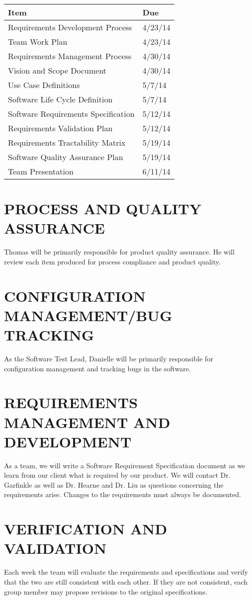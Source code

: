 \documentclass[11pt]{article}
\begin{document}
\begin{tabularx}{\textwidth}{|X|l|}
\hline
\textbf{Item} & \textbf{Due}\\
\hline
Requirements Development Process & 4/23/14\\ \hline
Team Work Plan & 4/23/14\\ \hline
Requirements Management Process & 4/30/14\\ \hline
Vision and Scope Document & 4/30/14\\ \hline
Use Case Definitions & 5/7/14\\ \hline
Software Life Cycle Definition & 5/7/14\\ \hline
Software Requirements Specification & 5/12/14\\ \hline
Requirements Validation Plan & 5/12/14\\ \hline
Requirements Tractability Matrix & 5/19/14\\ \hline
Software Quality Assurance Plan & 5/19/14\\ \hline
Team Presentation & 6/11/14\\ \hline
\end{tabularx}

\section{PROCESS AND QUALITY ASSURANCE}
Thomas will be primarily responsible for product quality assurance. He will review each item produced for process compliance and product quality.

\section{CONFIGURATION MANAGEMENT/BUG TRACKING}
As the Software Test Lead, Danielle will be primarily responsible for configuration management and tracking bugs in the software.

\section{REQUIREMENTS MANAGEMENT AND DEVELOPMENT}
As a team, we will write a Software Requirement Specification document as we learn from our client what is required by our product. We will contact Dr. Garfinkle as well as Dr. Hearne and Dr. Liu as questions concerning the requirements arise. Changes to the requirements must always be documented.

\section{VERIFICATION AND VALIDATION}
Each week the team will evaluate the requirements and specifications and verify that the two are still consistent with each other. If they are not consistent, each group member may propose revisions to the original specifications.
\end{document}

